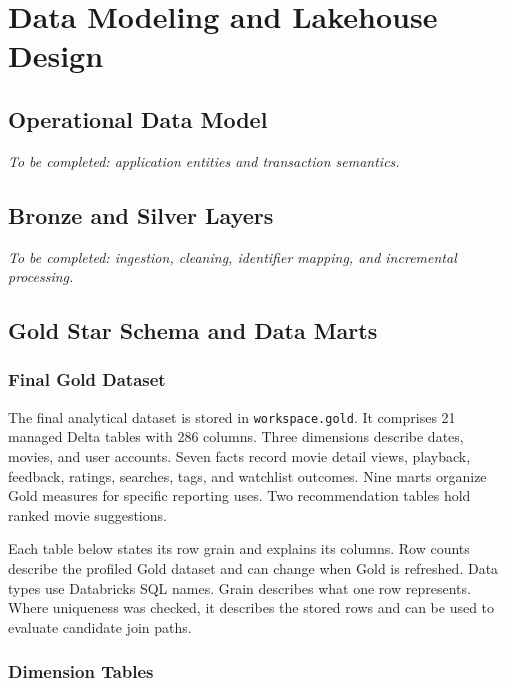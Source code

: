 \documentclass[a4paper,12pt]{article}
\begin{document}

\clearpage
\section{Data Modeling and Lakehouse Design}
\label{sec:modeling}

\subsection{Operational Data Model}

\textit{To be completed: application entities and transaction semantics.}

\subsection{Bronze and Silver Layers}

\textit{To be completed: ingestion, cleaning, identifier mapping,
and incremental processing.}


\subsection{Gold Star Schema and Data Marts}
\label{sec:gold-dashboard-model}

\subsubsection{Final Gold Dataset}

The final analytical dataset is stored in \texttt{workspace.gold}.
It comprises 21 managed Delta tables with 286 columns. Three
dimensions describe dates, movies, and user accounts. Seven facts
record movie detail views, playback, feedback, ratings, searches,
tags, and watchlist outcomes. Nine marts organize Gold measures
for specific reporting uses. Two recommendation tables hold ranked
movie suggestions.

Each table below states its row grain and explains its columns.
Row counts describe the profiled Gold dataset and can change when
Gold is refreshed. Data types use Databricks SQL names. Grain
describes what one row represents. Where uniqueness was checked,
it describes the stored rows and can be used to evaluate candidate
join paths.

\subsubsection{Dimension Tables}
\end{document}
